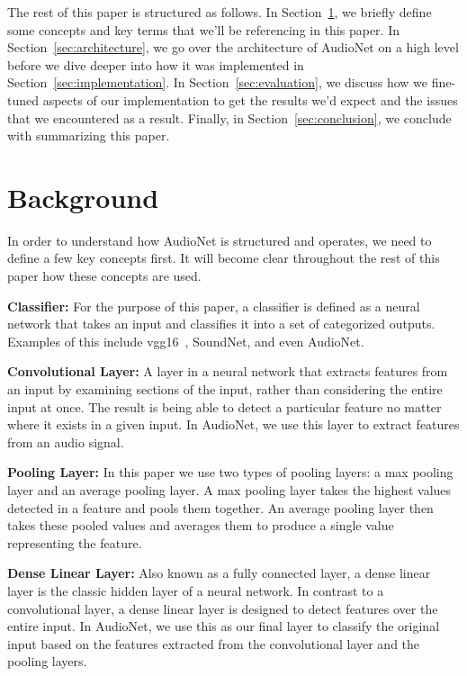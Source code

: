 \documentclass[12pt,twoside]{article}
\theoremstyle{plain}
\theoremstyle{definition}
\theoremstyle{remark}
\begin{document}
The rest of this paper is structured as follows.
In Section~\ref{sec:background}, we briefly define some concepts and key terms that we’ll be referencing in this paper.
In Section~\ref{sec:architecture}, we go over the architecture of AudioNet on a high level before we dive deeper into how it was implemented in Section~\ref{sec:implementation}.
In Section~\ref{sec:evaluation}, we discuss how we fine-tuned aspects of our implementation to get the results we’d expect and the issues that we encountered as a result.
Finally, in Section~\ref{sec:conclusion}, we conclude with summarizing this paper.


\section{Background}
\label{sec:background}
In order to understand how AudioNet is structured and operates, we need to define a few key concepts first.
It will become clear throughout the rest of this paper how these concepts are used.

\bigskip
\noindent
\textbf{Classifier:}
For the purpose of this paper, a classifier is defined as a neural network that takes an input and classifies it into a set of categorized outputs.
Examples of this include vgg16~\cite{Simonyan:2014}, SoundNet, and even AudioNet.

\bigskip
\noindent
\textbf{Convolutional Layer:}
A layer in a neural network that extracts features from an input by examining sections of the input, rather than considering the entire input at once.
The result is being able to detect a particular feature no matter where it exists in a given input.
In AudioNet, we use this layer to extract features from an audio signal.

\bigskip
\noindent
\textbf{Pooling Layer:}
In this paper we use two types of pooling layers: a max pooling layer and an average pooling layer.
A max pooling layer takes the highest values detected in a feature and pools them together.
An average pooling layer then takes these pooled values and averages them to produce a single value representing the feature.

\bigskip
\noindent
\textbf{Dense Linear Layer:}
Also known as a fully connected layer, a dense linear layer is the classic hidden layer of a neural network.
In contrast to a convolutional layer, a dense linear layer is designed to detect features over the entire input.
In AudioNet, we use this as our final layer to classify the original input based on the features extracted from the convolutional layer and the pooling layers.
\end{document}
